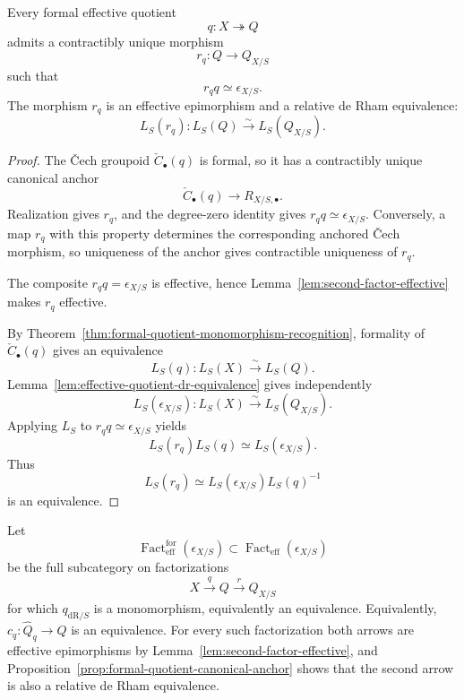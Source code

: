 \begin{proposition}
\label{prop:formal-quotient-canonical-anchor}
Every formal effective quotient
\[
    q:X\twoheadrightarrow Q
\]
admits a contractibly unique morphism
\[
    r_q:Q\longrightarrow Q_{X/S}
\]
such that
\[
    r_qq\simeq\epsilon_{X/S}.
\]
The morphism $r_q$ is an effective epimorphism and a relative de Rham
equivalence:
\[
    L_S(r_q):
    L_S(Q)\xrightarrow{\sim}L_S(Q_{X/S}).
\]
\end{proposition}

\begin{proof}
The \v{C}ech groupoid $\check C_\bullet(q)$ is formal, so it has a
contractibly unique canonical anchor
\[
    \check C_\bullet(q)\longrightarrow R_{X/S,\bullet}.
\]
Realization gives $r_q$, and the degree-zero identity gives
$r_qq\simeq\epsilon_{X/S}$.  Conversely, a map $r_q$ with this property
determines the corresponding anchored \v{C}ech morphism, so uniqueness of the
anchor gives contractible uniqueness of $r_q$.

The composite $r_qq=\epsilon_{X/S}$ is effective, hence
Lemma~\ref{lem:second-factor-effective} makes $r_q$ effective.

By Theorem~\ref{thm:formal-quotient-monomorphism-recognition},
formality of $\check C_\bullet(q)$ gives an equivalence
\[
    L_S(q):L_S(X)\xrightarrow{\sim}L_S(Q).
\]
Lemma~\ref{lem:effective-quotient-dr-equivalence} gives independently
\[
    L_S(\epsilon_{X/S}):
    L_S(X)\xrightarrow{\sim}L_S(Q_{X/S}).
\]
Applying $L_S$ to $r_qq\simeq\epsilon_{X/S}$ yields
\[
    L_S(r_q)L_S(q)\simeq L_S(\epsilon_{X/S}).
\]
Thus
\[
    L_S(r_q)
    \simeq
    L_S(\epsilon_{X/S})L_S(q)^{-1}
\]
is an equivalence.
\end{proof}

\begin{definition}
\label{def:formal-infinitesimal-quotient-factorizations}
Let
\[
    \operatorname{Fact}^{\mathrm{for}}_{\mathrm{eff}}
    (\epsilon_{X/S})
    \subset
    \operatorname{Fact}_{\mathrm{eff}}(\epsilon_{X/S})
\]
be the full subcategory on factorizations
\[
    X\xrightarrow{q}Q\xrightarrow{r}Q_{X/S}
\]
for which $q_{\mathrm{dR}/S}$ is a monomorphism, equivalently an
equivalence.  Equivalently, $c_q:\widehat Q_q\to Q$ is an equivalence.
For every such factorization both arrows are effective epimorphisms by
Lemma~\ref{lem:second-factor-effective}, and
Proposition~\ref{prop:formal-quotient-canonical-anchor} shows that the second
arrow is also a relative de Rham equivalence.
\end{definition}

